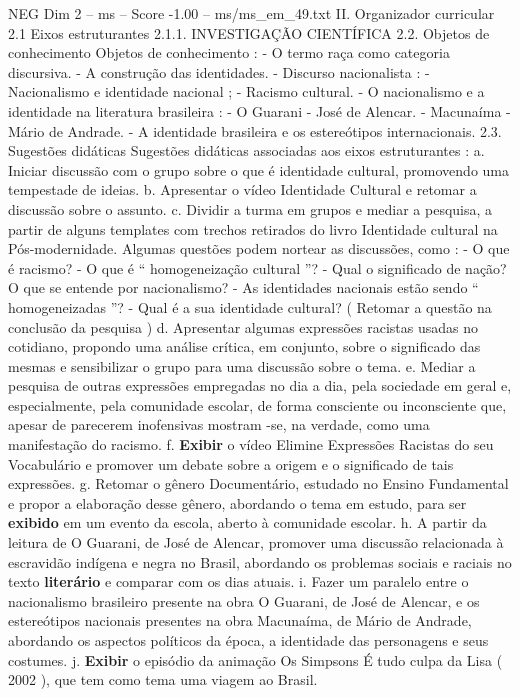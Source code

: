 \begin{textsample}{NEG Dim 2 – ms – Score -1.00 – ms/ms\_em\_49.txt}  \label{ex:f2_neg_245}
II.
Organizador curricular 2.1 Eixos estruturantes 2.1.1.
INVESTIGAÇÃO CIENTÍFICA 2.2.
Objetos de conhecimento Objetos de conhecimento : - O termo raça como categoria discursiva. - A construção das identidades. - Discurso nacionalista : - Nacionalismo e identidade nacional ; - Racismo cultural. - O nacionalismo e a identidade na literatura brasileira : - O Guarani - José de Alencar. - Macunaíma - Mário de Andrade. - A identidade brasileira e os estereótipos internacionais. 2.3.
Sugestões didáticas Sugestões didáticas associadas aos eixos estruturantes : a.
Iniciar discussão com o grupo sobre o que é identidade cultural, promovendo uma tempestade de ideias. b.
Apresentar o vídeo Identidade Cultural e retomar a discussão sobre o assunto. c.
Dividir a turma em grupos e mediar a pesquisa, a partir de alguns templates com trechos retirados do livro Identidade cultural na Pós-modernidade.
Algumas questões podem nortear as discussões, como : - O que é racismo? - O que é “ homogeneização cultural ”? - Qual o significado de nação?
O que se entende por nacionalismo? - As identidades nacionais estão sendo “ homogeneizadas ”? - Qual é a sua identidade cultural? ( Retomar a questão na conclusão da pesquisa ) d.
Apresentar algumas expressões racistas usadas no cotidiano, propondo uma análise crítica, em conjunto, sobre o significado das mesmas e sensibilizar o grupo para uma discussão sobre o tema. e.
Mediar a pesquisa de outras expressões empregadas no dia a dia, pela sociedade em geral e, especialmente, pela comunidade escolar, de forma consciente ou inconsciente que, apesar de parecerem inofensivas mostram -se, na verdade, como uma manifestação do racismo. f. \textbf{Exibir} o vídeo Elimine Expressões Racistas do seu Vocabulário e promover um debate sobre a origem e o significado de tais expressões. g.
Retomar o gênero Documentário, estudado no Ensino Fundamental e propor a elaboração desse gênero, abordando o tema em estudo, para ser \textbf{exibido} em um evento da escola, aberto à comunidade escolar. h.
A partir da leitura de O Guarani, de José de Alencar, promover uma discussão relacionada à escravidão indígena e negra no Brasil, abordando os problemas sociais e raciais no texto \textbf{literário} e comparar com os dias atuais. i.
Fazer um paralelo entre o nacionalismo brasileiro presente na obra O Guarani, de José de Alencar, e os estereótipos nacionais presentes na obra Macunaíma, de Mário de Andrade, abordando os aspectos políticos da época, a identidade das personagens e seus costumes. j. \textbf{Exibir} o episódio da animação Os Simpsons É tudo culpa da Lisa ( 2002 ), que tem como tema uma viagem ao Brasil.

\end{textsample}
